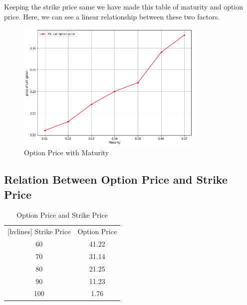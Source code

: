 \noindent Keeping the strike price same we have made this table of maturity and option price. Here, we can see a linear relationship between these two factors. 
\begin{figure}[H]
	\begin{center}
		\includegraphics[width=0.8\textwidth]{MC_call_option_price}
	\end{center}
	\caption{Option Price with Maturity}
\end{figure}



\subsection{Relation Between Option Price and Strike Price}



\begin{table}[H]
\begin{center}
	\begin{NiceTabular}{|c|c|}[hvlines]
		 Strike Price & Option Price\\ 
		60 & 41.22 \\ 
		70 & 31.14 \\
		80 & 21.25 \\
		90 & 11.23  \\
		100 & 1.76 \\
	\end{NiceTabular}
\end{center}
	\caption{Option Price and Strike Price}
\end{table}


